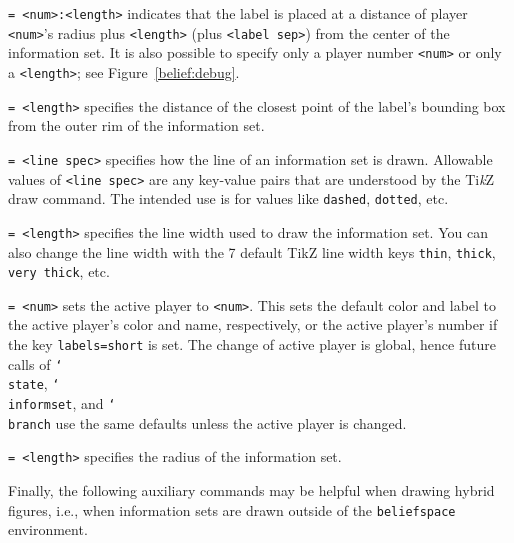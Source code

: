 \documentclass{article}
\newenvironment{desc}{\itemize[leftmargin=50pt]}{\enditemize}
\def\option#1#2{\item[\texttt{#1}] \hskip-1.5pt\texttt{#2}}
\renewcommand{\textbackslash}{\char`\\}
\def\cmd#1{\texttt{\color{cmd}\textbackslash#1}}
\def\TikZ{Ti\emph{k}Z\xspace}
\begin{document}
\begin{desc}
\option{label radius}{= <num>:<length>} indicates that the label is placed at a distance of player \texttt{<num>}'s radius plus \texttt{<length>} (plus \texttt{<label sep>}) from the center of the information set. It is also possible to specify only a player number \texttt{<num>} or only a \texttt{<length>}; see Figure~\ref{belief:debug}.

\option{label sep}{= <length>} specifies the distance of the closest point of the label's bounding box from the outer rim of the information set.

\option{line}{= <line spec>} specifies how the line of an information set is drawn. Allowable values of \texttt{<line spec>} are any key-value pairs that are understood by the \TikZ draw command. The intended use is for values like \texttt{dashed}, \texttt{dotted}, etc.

\option{line width}{= <length>} specifies the line width used to draw the information set. You can also change the line width with the 7 default TikZ line width keys \texttt{thin}, \texttt{thick}, \texttt{very thick}, etc.

\option{player}{= <num>} sets the active player to \texttt{<num>}. This sets the default color and label to the active player's color and name, respectively, or the active player's number if the key \texttt{labels=short} is set. The change of active player is global, hence future calls of \cmd{state}, \cmd{informset}, and \cmd{branch} use the same defaults unless the active player is changed.

\option{radius}{= <length>} specifies the radius of the information set. %
\end{desc}

\noindent Finally, the following auxiliary commands may be helpful when drawing hybrid figures, i.e., when information sets are drawn outside of the \texttt{beliefspace} environment.
\end{document}

